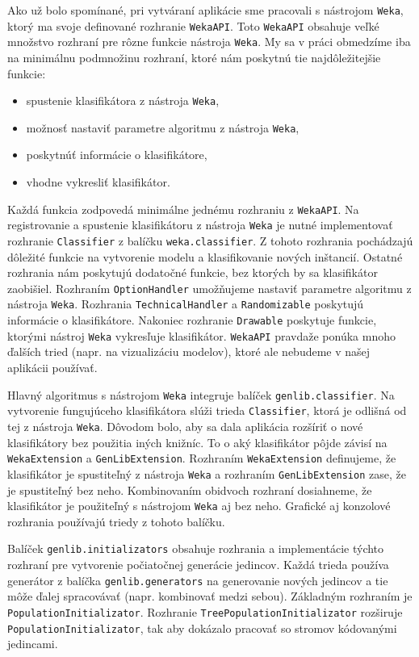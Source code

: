 Ako už bolo spomínané, pri vytváraní aplikácie sme pracovali s nástrojom \verb|Weka|, ktorý ma svoje definované rozhranie \verb|WekaAPI|. Toto \verb|WekaAPI| obsahuje veľké množstvo rozhraní pre rôzne funkcie nástroja \verb|Weka|. My sa v práci obmedzíme iba na minimálnu podmnožinu rozhraní, ktoré nám poskytnú tie najdôležitejšie funkcie:
\begin{itemize}
\item spustenie klasifikátora z nástroja \texttt{Weka},
\item možnosť nastaviť parametre algoritmu z nástroja \texttt{Weka},
\item poskytnúť informácie o klasifikátore,
\item vhodne vykresliť klasifikátor.
\end{itemize}
Každá funkcia zodpovedá minimálne jednému rozhraniu z \verb|WekaAPI|. Na registrovanie a spustenie klasifikátoru z nástroja \verb|Weka| je nutné implementovať rozhranie \verb|Classifier| z balíčku \verb|weka.classifier|. Z tohoto rozhrania pochádzajú dôležité funkcie na vytvorenie modelu a klasifikovanie nových inštancií. Ostatné rozhrania nám poskytujú dodatočné funkcie, bez ktorých by sa klasifikátor zaobišiel. Rozhraním \verb|OptionHandler| umožňujeme nastaviť parametre algoritmu z nástroja \verb|Weka|. Rozhrania \verb|TechnicalHandler| a \verb|Randomizable| poskytujú informácie o klasifikátore. Nakoniec rozhranie \verb|Drawable| poskytuje funkcie, ktorými nástroj \verb|Weka| vykresľuje klasifikátor. \verb|WekaAPI| pravdaže ponúka mnoho ďalších tried (napr. na vizualizáciu modelov), ktoré ale nebudeme v našej aplikácii používať.

Hlavný algoritmus s nástrojom \verb|Weka| integruje balíček \verb|genlib.classifier|. Na vytvorenie fungujúceho klasifikátora slúži trieda \verb|Classifier|, ktorá je odlišná od tej z nástroja \verb|Weka|. Dôvodom bolo, aby sa dala aplikácia rozšíriť o nové klasifikátory bez použitia iných knižníc. To o aký klasifikátor pôjde závisí na \verb|WekaExtension| a \verb|GenLibExtension|. Rozhraním \verb|WekaExtension| definujeme, že klasifikátor je spustiteľný z nástroja \verb|Weka| a rozhraním \verb|GenLibExtension| zase, že je spustiteľný bez neho. Kombinovaním obidvoch rozhraní dosiahneme, že klasifikátor je použiteľný s nástrojom \verb|Weka| aj bez neho. Grafické aj konzolové rozhrania používajú triedy z tohoto balíčku.

Balíček \verb|genlib.initializators| obsahuje rozhrania a implementácie týchto rozhraní pre vytvorenie počiatočnej generácie jedincov. Každá trieda používa generátor z balíčka \verb|genlib.generators| na generovanie nových jedincov a tie môže ďalej spracovávať (napr. kombinovať medzi sebou). Základným rozhraním je \verb|PopulationInitializator|. Rozhranie  \verb|TreePopulationInitializator| rozširuje \verb|PopulationInitializator|, tak aby dokázalo pracovať so stromov kódovanými jedincami.

